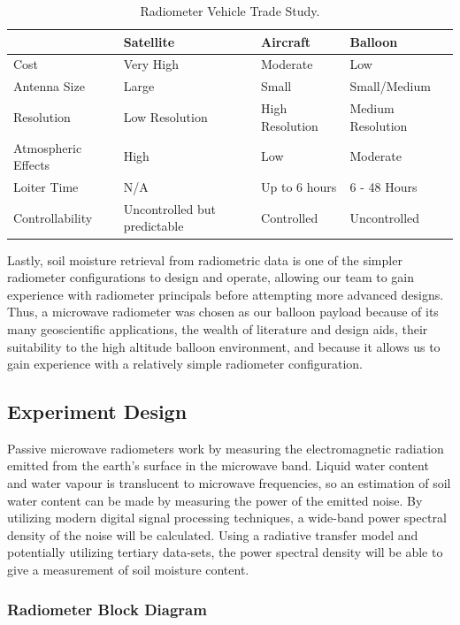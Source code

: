 \documentclass[12pt]{article}
\begin{document}
\begin{table}[!h]
	\centering
	\vspace{0.5cm}
	\renewcommand{\arraystretch}{1.3}
	\caption{Radiometer Vehicle Trade Study. }
	\label{tab:vehicle_trade}
	\begin{tabularx}{\textwidth}{llll}
		\toprule
						& Satellite & Aircraft & Balloon \\		
		\midrule
		Cost					&Very High&Moderate&Low \\ 
		Antenna Size 			&Large&Small&Small/Medium \\
		Resolution 				&Low Resolution&High Resolution&Medium Resolution \\ 
		Atmospheric Effects		&High&Low&Moderate \\ 
		Loiter Time				&N/A&Up to 6 hours&6 - 48 Hours \\ 
		Controllability			&Uncontrolled but predictable&Controlled&Uncontrolled 
	\end{tabularx}
\end{table}

Lastly, soil moisture retrieval from radiometric data is one of the simpler radiometer configurations to design and operate, allowing our team to gain experience with radiometer principals before attempting more advanced designs. Thus, a microwave radiometer was chosen as our balloon payload because of its many geoscientific applications, the wealth of literature and design aids, their suitability to the high altitude balloon environment, and because it allows us to gain experience with a relatively simple radiometer configuration.
 
\subsection{Experiment Design}

Passive microwave radiometers work by measuring the electromagnetic radiation emitted from the earth's surface in the microwave band. Liquid water content and water vapour is translucent to microwave frequencies, so an estimation of soil water content can be made by measuring the power of the emitted noise. By utilizing modern digital signal processing techniques, a wide-band power spectral density of the noise will be calculated. Using a radiative transfer model and potentially utilizing tertiary data-sets, the power spectral density will be able to give a measurement of soil moisture content.

\subsubsection{Radiometer Block Diagram}
\end{document}
